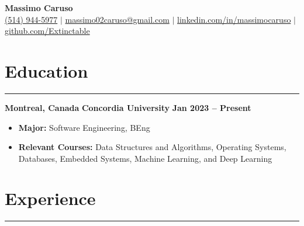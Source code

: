 \documentclass[10pt]{article}
\begin{document}
\newcommand{\fullname}{Massimo Caruso}
\newcommand{\phone}{(514) 944-5977}
\newcommand{\email}{massimo02caruso@gmail.com}
\newcommand{\linkedin}{linkedin.com/in/massimocaruso}
\newcommand{\github}{github.com/Extinctable}

\begin{center}
    {\Huge \textbf{\fullname}} \\
    \vspace{1mm}
    {\small 
    \faPhone \hspace{0mm} \href{tel:+15149445977}{\phone} $\vert$ 
    \faEnvelope \hspace{0mm} \href{mailto:massimo02caruso@gmail.com}{\email} $\vert$ 
    \faLinkedin \hspace{0mm} \href{https://linkedin.com/in/massimocaruso}{\linkedin} $\vert$ 
    \faGithub \hspace{0mm} \href{https://github.com/Extinctable}{\github}
    }
\end{center}

\vspace{-8mm}


\section*{Education}
\vspace{-2mm}
\hrule
\vspace{0mm}

\textbf{Montreal, Canada} \hfill \textbf{Concordia University} \hfill \textbf{Jan 2023 -- Present} 
\vspace{-4mm}
\begin{itemize}[left=0.15in, itemsep=0pt]
    \item \textbf{Major:} Software Engineering, BEng
    \item \textbf{Relevant Courses:} Data Structures and Algorithms, Operating Systems, Databases, Embedded Systems, Machine Learning, and Deep Learning
\end{itemize}


\vspace{-6mm} %
\section*{Experience}
\vspace{-2mm}
\hrule
\vspace{0mm}
\end{document}
